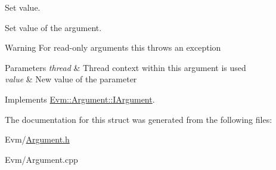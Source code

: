 Set value. 

Set value of the argument. \begin{DoxyWarning}{Warning}
For read-\/only arguments this throws an exception 
\end{DoxyWarning}

\begin{DoxyParams}{Parameters}
{\em thread} & Thread context within this argument is used \\
\hline
{\em value} & New value of the parameter \\
\hline
\end{DoxyParams}


Implements \mbox{\hyperlink{struct_evm_1_1_argument_1_1_i_argument_a24e4c76f2750e664e3895d2ff4b9146d}{Evm\+::\+Argument\+::\+I\+Argument}}.



The documentation for this struct was generated from the following files\+:\begin{DoxyCompactItemize}
\item 
Evm/\mbox{\hyperlink{_argument_8h}{Argument.\+h}}\item 
Evm/Argument.\+cpp\end{DoxyCompactItemize}
